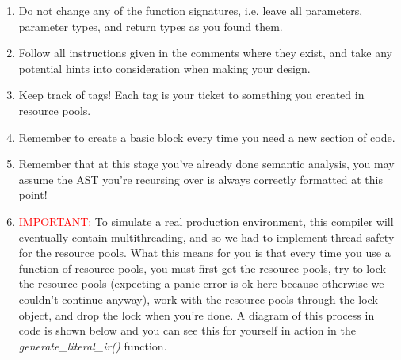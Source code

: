\documentclass[
	12pt, %
]{fphw}
\begin{document}
\begin{problem}
    \begin{enumerate}
        \item Do not change any of the function signatures, i.e. leave all parameters, parameter types, and return types as you found them.
        \item Follow all instructions given in the comments where they exist, and take any potential hints into consideration when making your design.
        \item Keep track of tags! Each tag is your ticket to something you created in resource pools.
        \item Remember to create a basic block every time you need a new section of code.
        \item Remember that at this stage you've already done semantic analysis, you may assume the AST you're recursing over is always correctly formatted at this point!
        \item \textcolor{red}{IMPORTANT:} To simulate a real production environment, this compiler will eventually contain multithreading, and so we had to implement thread safety for the resource pools. What this means for you is that every time you use a function of resource pools, you must first get the resource pools, try to lock the resource pools (expecting a panic error is ok here because otherwise we couldn't continue anyway), work with the resource pools through the lock object, and drop the lock when you're done. A diagram of this process in code is shown below and you can see this for yourself in action in the \textit{generate\_literal\_ir()} function.

        
    \end{enumerate}
\end{problem}

\pagebreak
\end{document}
